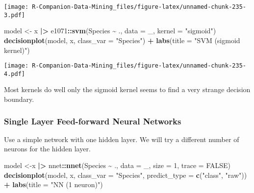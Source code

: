 \documentclass[
  notitlepage]{book}
\newenvironment{Shaded}{\begin{snugshade}}{\end{snugshade}}
\newcommand{\DataTypeTok}[1]{\textcolor[rgb]{0.13,0.29,0.53}{#1}}
\newcommand{\DecValTok}[1]{\textcolor[rgb]{0.00,0.00,0.81}{#1}}
\newcommand{\ErrorTok}[1]{\textcolor[rgb]{0.64,0.00,0.00}{\textbf{#1}}}
\newcommand{\KeywordTok}[1]{\textcolor[rgb]{0.13,0.29,0.53}{\textbf{#1}}}
\newcommand{\NormalTok}[1]{#1}
\newcommand{\OperatorTok}[1]{\textcolor[rgb]{0.81,0.36,0.00}{\textbf{#1}}}
\newcommand{\OtherTok}[1]{\textcolor[rgb]{0.56,0.35,0.01}{#1}}
\newcommand{\StringTok}[1]{\textcolor[rgb]{0.31,0.60,0.02}{#1}}
\begin{document}
\texttt{[image: R-Companion-Data-Mining\_files/figure-latex/unnamed-chunk-235-3.pdf]}

\begin{Shaded}
\begin{Highlighting}[]
\NormalTok{model \textless{}{-}}\StringTok{ }\NormalTok{x }\OperatorTok{|}\ErrorTok{\textgreater{}}\StringTok{ }\NormalTok{e1071}\OperatorTok{::}\KeywordTok{svm}\NormalTok{(Species }\OperatorTok{\textasciitilde{}}\StringTok{ }\NormalTok{., }\DataTypeTok{data =}\NormalTok{ \_, }
                         \DataTypeTok{kernel =} \StringTok{"sigmoid"}\NormalTok{)}
\KeywordTok{decisionplot}\NormalTok{(model, x, }\DataTypeTok{class\_var =} \StringTok{"Species"}\NormalTok{) }\OperatorTok{+}\StringTok{ }
\StringTok{  }\KeywordTok{labs}\NormalTok{(}\DataTypeTok{title =} \StringTok{"SVM (sigmoid kernel)"}\NormalTok{)}
\end{Highlighting}
\end{Shaded}

\texttt{[image: R-Companion-Data-Mining\_files/figure-latex/unnamed-chunk-235-4.pdf]}

Most kernels do well only the sigmoid kernel seems to find a
very strange decision boundary.

\hypertarget{single-layer-feed-forward-neural-networks}{%
\subsubsection{Single Layer Feed-forward Neural Networks}\label{single-layer-feed-forward-neural-networks}}

Use a simple network with one hidden layer. We will try a
different number of
neurons for the hidden layer.

\begin{Shaded}
\begin{Highlighting}[]
\NormalTok{model \textless{}{-}x }\OperatorTok{|}\ErrorTok{\textgreater{}}\StringTok{ }\NormalTok{nnet}\OperatorTok{::}\KeywordTok{nnet}\NormalTok{(Species }\OperatorTok{\textasciitilde{}}\StringTok{ }\NormalTok{., }\DataTypeTok{data =}\NormalTok{ \_, }
                        \DataTypeTok{size =} \DecValTok{1}\NormalTok{, }\DataTypeTok{trace =} \OtherTok{FALSE}\NormalTok{)}
\KeywordTok{decisionplot}\NormalTok{(model, x, }\DataTypeTok{class\_var  =} \StringTok{"Species"}\NormalTok{, }
             \DataTypeTok{predict\_type =} \KeywordTok{c}\NormalTok{(}\StringTok{"class"}\NormalTok{, }\StringTok{"raw"}\NormalTok{)) }\OperatorTok{+}\StringTok{ }
\StringTok{  }\KeywordTok{labs}\NormalTok{(}\DataTypeTok{title =} \StringTok{"NN (1 neuron)"}\NormalTok{)}
\end{Highlighting}
\end{Shaded}
\end{document}
